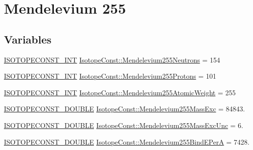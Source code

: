 \hypertarget{group___isotope_const-_mendelevium-_md255}{}\section{Mendelevium 255}
\label{group___isotope_const-_mendelevium-_md255}
\subsection*{Variables}
\begin{DoxyCompactItemize}
\item 
\mbox{\hyperlink{group___isotope_const-_macros_ga5f18360b3e99483a35c32d789e62621c}{I\+S\+O\+T\+O\+P\+E\+C\+O\+N\+S\+T\+\_\+\+I\+NT}} \mbox{\hyperlink{group___isotope_const-_mendelevium-_md255_ga99e72555f60b70fd3587c8f97a87fd8b}{Isotope\+Const\+::\+Mendelevium255\+Neutrons}} = 154
\item 
\mbox{\hyperlink{group___isotope_const-_macros_ga5f18360b3e99483a35c32d789e62621c}{I\+S\+O\+T\+O\+P\+E\+C\+O\+N\+S\+T\+\_\+\+I\+NT}} \mbox{\hyperlink{group___isotope_const-_mendelevium-_md255_gac9e0edd1325e83f725c2656e8084035b}{Isotope\+Const\+::\+Mendelevium255\+Protons}} = 101
\item 
\mbox{\hyperlink{group___isotope_const-_macros_ga5f18360b3e99483a35c32d789e62621c}{I\+S\+O\+T\+O\+P\+E\+C\+O\+N\+S\+T\+\_\+\+I\+NT}} \mbox{\hyperlink{group___isotope_const-_mendelevium-_md255_gabdeb551d3b83fd538ad6ae70913a2c54}{Isotope\+Const\+::\+Mendelevium255\+Atomic\+Weight}} = 255
\item 
\mbox{\hyperlink{group___isotope_const-_macros_ga8f45a7272ce02c0b4c65c44636ed719a}{I\+S\+O\+T\+O\+P\+E\+C\+O\+N\+S\+T\+\_\+\+D\+O\+U\+B\+LE}} \mbox{\hyperlink{group___isotope_const-_mendelevium-_md255_ga456f248deaf28314aa356d7356ebdfa6}{Isotope\+Const\+::\+Mendelevium255\+Mass\+Exc}} = 84843.
\item 
\mbox{\hyperlink{group___isotope_const-_macros_ga8f45a7272ce02c0b4c65c44636ed719a}{I\+S\+O\+T\+O\+P\+E\+C\+O\+N\+S\+T\+\_\+\+D\+O\+U\+B\+LE}} \mbox{\hyperlink{group___isotope_const-_mendelevium-_md255_gad11ae4d36e0a09ac7a4faccee3bb7f30}{Isotope\+Const\+::\+Mendelevium255\+Mass\+Exc\+Unc}} = 6.
\item 
\mbox{\hyperlink{group___isotope_const-_macros_ga8f45a7272ce02c0b4c65c44636ed719a}{I\+S\+O\+T\+O\+P\+E\+C\+O\+N\+S\+T\+\_\+\+D\+O\+U\+B\+LE}} \mbox{\hyperlink{group___isotope_const-_mendelevium-_md255_ga72ee01956b7fd25dd403d83432c44ab7}{Isotope\+Const\+::\+Mendelevium255\+Bind\+E\+PerA}} = 7428.

\end{DoxyCompactItemize}
